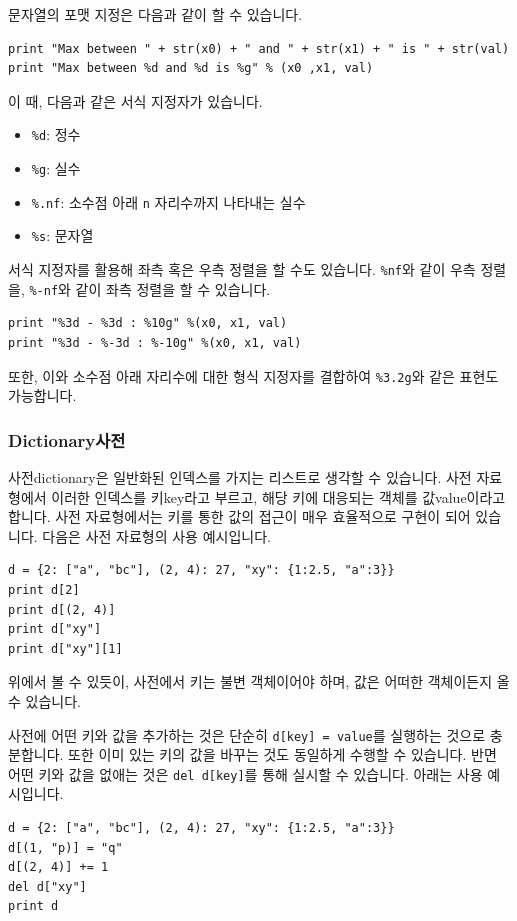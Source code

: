 \documentclass[../main.tex]{subfiles}
\begin{document}
문자열의 포맷 지정은 다음과 같이 할 수 있습니다.
\begin{verbatim}
print "Max between " + str(x0) + " and " + str(x1) + " is " + str(val)
print "Max between %d and %d is %g" % (x0 ,x1, val)
\end{verbatim}
이 때, 다음과 같은 서식 지정자가 있습니다.
\begin{itemize}
    \item \texttt{\%d}: 정수
    \item \texttt{\%g}: 실수
    \item \texttt{\%.nf}: 소수점 아래 \texttt{n} 자리수까지 나타내는 실수
    \item \texttt{\%s}: 문자열
\end{itemize}
서식 지정자를 활용해 좌측 혹은 우측 정렬을 할 수도 있습니다.
\texttt{\%nf}와 같이 우측 정렬을, \texttt{\%-nf}와 같이 좌측 정렬을 할 수 있습니다.
\begin{verbatim}
print "%3d - %3d : %10g" %(x0, x1, val)
print "%3d - %-3d : %-10g" %(x0, x1, val)
\end{verbatim}
또한, 이와 소수점 아래 자리수에 대한 형식 지정자를 결합하여 \texttt{\%3.2g}와 같은 표현도 가능합니다.

\subsubsection{Dictionary사전}
사전dictionary은 일반화된 인덱스를 가지는 리스트로 생각할 수 있습니다.
사전 자료형에서 이러한 인덱스를 키key라고 부르고, 해당 키에 대응되는 객체를 값value이라고 합니다.
사전 자료형에서는 키를 통한 값의 접근이 매우 효율적으로 구현이 되어 있습니다.
다음은 사전 자료형의 사용 예시입니다.
\begin{verbatim}
d = {2: ["a", "bc"], (2, 4): 27, "xy": {1:2.5, "a":3}}
print d[2]
print d[(2, 4)]
print d["xy"]
print d["xy"][1]
\end{verbatim}
위에서 볼 수 있듯이, 사전에서 키는 불변 객체이어야 하며, 값은 어떠한 객체이든지 올 수 있습니다.

사전에 어떤 키와 값을 추가하는 것은 단순히 \texttt{d[key] = value}를 실행하는 것으로 충분합니다.
또한 이미 있는 키의 값을 바꾸는 것도 동일하게 수행할 수 있습니다.
반면 어떤 키와 값을 없애는 것은 \texttt{del d[key]}를 통해 실시할 수 있습니다.
아래는 사용 예시입니다.
\begin{verbatim}
d = {2: ["a", "bc"], (2, 4): 27, "xy": {1:2.5, "a":3}}
d[(1, "p)] = "q"
d[(2, 4)] += 1
del d["xy"]
print d
\end{verbatim}
\end{document}
